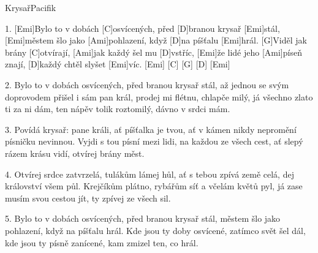 \begin{song}{Krysař}{Pacifik}

\begin{xverse}{1. }
[Emi]Bylo to v dobách [C]osvícených, před [D]branou krysař [Emi]stál,
[Emi]městem šlo jako [Ami]pohlazení, když [D]na píšťalu [Emi]hrál.
[G]Viděl jak brány [C]otvírají, [Ami]jak každý šel mu [D]vstříc,
[Emi]{že} lidé jeho [Ami]píseň znají, [D]každý chtěl slyšet [Emi]víc.
[Emi]{ } [C]{ } [G]{ } [D]{ } [Emi]{ }
\end{xverse}


\begin{xverse}{2. }
Bylo to v dobách osvícených, před branou krysař stál,
až jednou se svým doprovodem přišel i sám pan král,
prodej mi flétnu, chlapče milý, já všechno zlato ti za ni dám,
ten nápěv tolik roztomilý, dávno v srdci mám.
\end{xverse}


\begin{xverse}{3. }
Povídá krysař: pane králi, ať píšťalka je tvou,
ať v kámen nikdy nepromění písničku nevinnou.
Vyjdi s tou písní mezi lidi, na každou ze všech cest,
ať slepý rázem krásu vidí, otvírej brány měst.
\end{xverse}


\begin{xverse}{4. }
Otvírej srdce zatvrzelá, tulákům lámej hůl,
ať s tebou zpívá země celá, dej království všem půl.
Krejčíkům plátno, rybářům síť a včelám květů pyl,
já zase musím svou cestou jít, ty zpívej ze všech sil.
\end{xverse}


\begin{xverse}{5. }
Bylo to v dobách osvícených, před branou krysař stál,
městem šlo jako pohlazení, když na píšťalu hrál.
Kde jsou ty doby osvícené, zatímco svět šel dál,
kde jsou ty písně zanícené, kam zmizel ten, co hrál.
\end{xverse}
\end{song}

